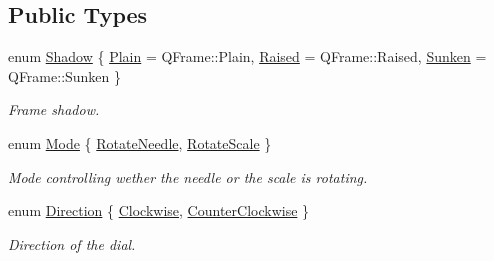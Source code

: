 \subsection*{Public Types}
\begin{DoxyCompactItemize}
\item 
enum \hyperlink{class_qwt_dial_a7472124cb120352e8538430ab48c2386}{Shadow} \{ \hyperlink{class_qwt_dial_a7472124cb120352e8538430ab48c2386a8d0cdae56d44bcd25574d7e432498d86}{Plain} = Q\-Frame\-:\-:Plain, 
\hyperlink{class_qwt_dial_a7472124cb120352e8538430ab48c2386a4054b8890d1f837387762b4a12157847}{Raised} = Q\-Frame\-:\-:Raised, 
\hyperlink{class_qwt_dial_a7472124cb120352e8538430ab48c2386ae1388e8ff1a378e22cd082fcb46aa685}{Sunken} = Q\-Frame\-:\-:Sunken
 \}
\begin{DoxyCompactList}\small\item\em Frame shadow. \end{DoxyCompactList}\item 
enum \hyperlink{class_qwt_dial_a7376f53193014b91643350e6e6bc85ad}{Mode} \{ \hyperlink{class_qwt_dial_a7376f53193014b91643350e6e6bc85adacc23db2e06c9098f8cfbd0181184054a}{Rotate\-Needle}, 
\hyperlink{class_qwt_dial_a7376f53193014b91643350e6e6bc85ada95a22f59ec832d22f011a9421f528c41}{Rotate\-Scale}
 \}
\begin{DoxyCompactList}\small\item\em Mode controlling wether the needle or the scale is rotating. \end{DoxyCompactList}\item 
enum \hyperlink{class_qwt_dial_af6bee6040f4342d4d60c5e1cf3a06b54}{Direction} \{ \hyperlink{class_qwt_dial_af6bee6040f4342d4d60c5e1cf3a06b54a820f9eed4dc5cce9ddaceeaf52569400}{Clockwise}, 
\hyperlink{class_qwt_dial_af6bee6040f4342d4d60c5e1cf3a06b54ade8fbcadeeee81f6d86e5ea1237d23a7}{Counter\-Clockwise}
 \}
\begin{DoxyCompactList}\small\item\em Direction of the dial. \end{DoxyCompactList}\end{DoxyCompactItemize}
